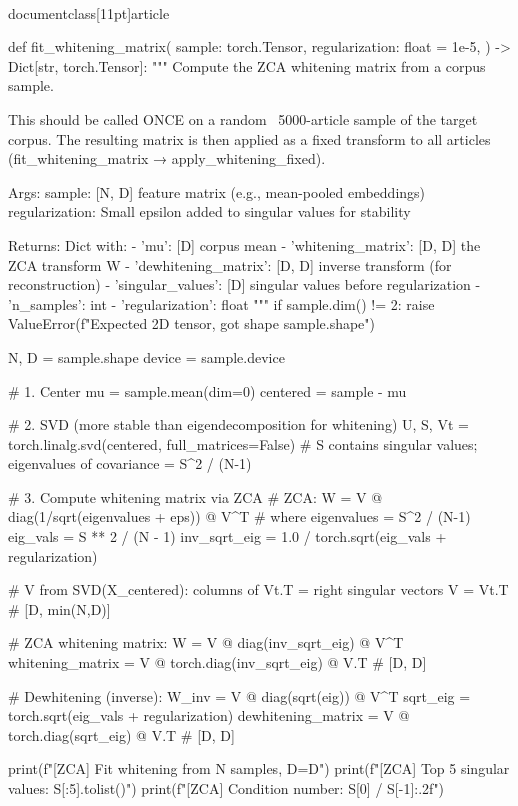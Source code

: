 \\documentclass[11pt]{article}
\begin{document}
\begin{CodeBlock}
{{{{{def fit_whitening_matrix(
    sample: torch.Tensor,
    regularization: float = 1e-5,
) -> Dict[str, torch.Tensor]:
    """
    Compute the ZCA whitening matrix from a corpus sample.

    This should be called ONCE on a random ~5000-article sample of the
    target corpus. The resulting matrix is then applied as a fixed transform
    to all articles (fit_whitening_matrix → apply_whitening_fixed).

    Args:
        sample: [N, D] feature matrix (e.g., mean-pooled embeddings)
        regularization: Small epsilon added to singular values for stability

    Returns:
        Dict with:
        - 'mu': [D] corpus mean
        - 'whitening_matrix': [D, D] the ZCA transform W
        - 'dewhitening_matrix': [D, D] inverse transform (for reconstruction)
        - 'singular_values': [D] singular values before regularization
        - 'n_samples': int
        - 'regularization': float
    """
    if sample.dim() != 2:
        raise ValueError(f"Expected 2D tensor, got shape {sample.shape}")

    N, D = sample.shape
    device = sample.device

    # 1. Center
    mu = sample.mean(dim=0)
    centered = sample - mu

    # 2. SVD (more stable than eigendecomposition for whitening)
    U, S, Vt = torch.linalg.svd(centered, full_matrices=False)
    # S contains singular values; eigenvalues of covariance = S^2 / (N-1)

    # 3. Compute whitening matrix via ZCA
    # ZCA: W = V @ diag(1/sqrt(eigenvalues + eps)) @ V^T
    # where eigenvalues = S^2 / (N-1)
    eig_vals = S ** 2 / (N - 1)
    inv_sqrt_eig = 1.0 / torch.sqrt(eig_vals + regularization)

    # V from SVD(X_centered): columns of Vt.T = right singular vectors
    V = Vt.T  # [D, min(N,D)]

    # ZCA whitening matrix: W = V @ diag(inv_sqrt_eig) @ V^T
    whitening_matrix = V @ torch.diag(inv_sqrt_eig) @ V.T  # [D, D]

    # Dewhitening (inverse): W_inv = V @ diag(sqrt(eig)) @ V^T
    sqrt_eig = torch.sqrt(eig_vals + regularization)
    dewhitening_matrix = V @ torch.diag(sqrt_eig) @ V.T  # [D, D]

    print(f"[ZCA] Fit whitening from {N} samples, D={D}")
    print(f"[ZCA] Top 5 singular values: {S[:5].tolist()}")
    print(f"[ZCA] Condition number: {S[0] / S[-1]:.2f}")

}}}}}
\end{CodeBlock}
\end{document}

